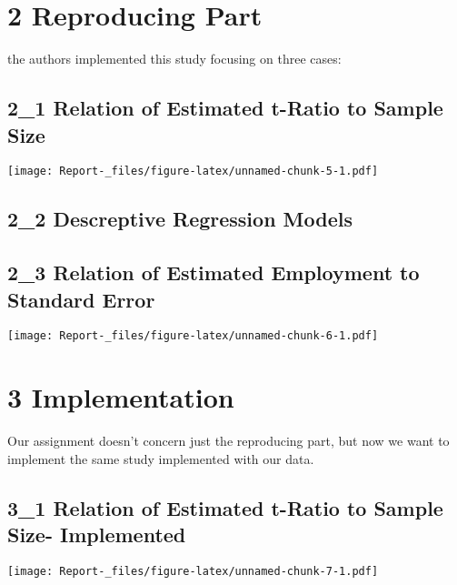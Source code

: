 \documentclass[
]{article}
\begin{document}
\hypertarget{reproducing-part}{%
\section{2 Reproducing Part}\label{reproducing-part}}

the authors implemented this study focusing on three cases:

\hypertarget{relation-of-estimated-t-ratio-to-sample-size}{%
\subsection{2\_1 Relation of Estimated t-Ratio to Sample
Size}\label{relation-of-estimated-t-ratio-to-sample-size}}

\texttt{[image: Report-\_files/figure-latex/unnamed-chunk-5-1.pdf]}

\hypertarget{descreptive-regression-models}{%
\subsection{2\_2 Descreptive Regression
Models}\label{descreptive-regression-models}}

\hypertarget{relation-of-estimated-employment-to-standard-error}{%
\subsection{2\_3 Relation of Estimated Employment to Standard
Error}\label{relation-of-estimated-employment-to-standard-error}}

\texttt{[image: Report-\_files/figure-latex/unnamed-chunk-6-1.pdf]}

\hypertarget{implementation}{%
\section{3 Implementation}\label{implementation}}

Our assignment doesn't concern just the reproducing part, but now we
want to implement the same study implemented with our data.

\hypertarget{relation-of-estimated-t-ratio-to-sample-size--implemented}{%
\subsection{3\_1 Relation of Estimated t-Ratio to Sample Size-
Implemented}\label{relation-of-estimated-t-ratio-to-sample-size--implemented}}

\texttt{[image: Report-\_files/figure-latex/unnamed-chunk-7-1.pdf]}
\end{document}
